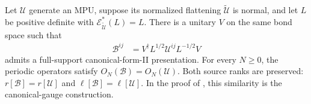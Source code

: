 \begin{lemma}
    \label{thm:mpu_positive_canonical_gauge}
    \leanok
    Let $\mathcal U$ generate an MPU, suppose its normalized flattening
    $\widetilde{\mathcal U}$ is normal, and let $L$ be positive definite
    with $\mathcal E_{\widetilde{\mathcal U}}^*(L)=L$.
    There is a unitary $V$ on the same bond space such that
    \begin{align}
        \mathcal B^{ij}
         & =V^\dagger L^{1/2}\mathcal U^{ij}L^{-1/2}V
        \label{eq:mpu_positive_canonical_gauge}
    \end{align}
    admits a full-support canonical-form-II presentation. For every
    $N\geq 0$, the periodic operators satisfy
    $O_N(\mathcal B)=O_N(\mathcal U)$.
    Both source ranks are preserved:
    $r[\mathcal B]=r[\mathcal U]$ and
    $\ell[\mathcal B]=\ell[\mathcal U]$.
    In the proof of \cite[Proposition~IV.5, lines~798--804]{Cirac2017MPU}, this similarity is the canonical-gauge
    construction.
\end{lemma}

